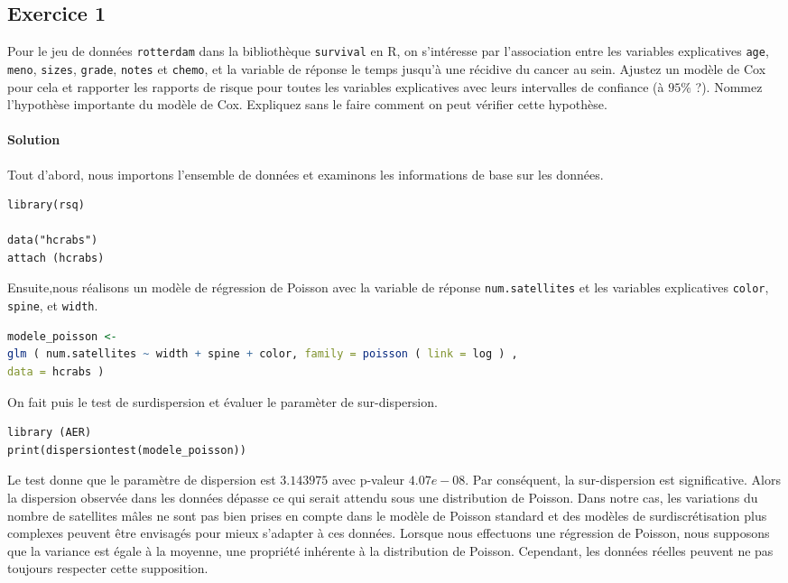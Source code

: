 \documentclass[../main.tex]{subfiles}
\begin{document}
\begin{CJK*}{UTF8}{gbsn}
\section*{Exercice 1}



Pour le jeu de données 
\texttt{rotterdam} dans la bibliothèque \texttt{survival} en R, 
on s'intéresse par l'association entre les variables explicatives \texttt{age}, \texttt{meno}, 
\texttt{sizes}, \texttt{grade}, \texttt{notes} et \texttt{chemo},
et la variable de réponse le temps jusqu'à une récidive du cancer au sein.
Ajustez un modèle de Cox pour cela et rapporter 
les rapports de risque pour toutes les variables explicatives avec leurs intervalles de confiance (à $95\%$ ?).
Nommez l'hypothèse importante du modèle de Cox. 
Expliquez sans le faire comment on peut vérifier cette hypothèse.

\paragraph{Solution}
Tout d'abord, nous importons l'ensemble de données et examinons les informations de base sur les données.

\begin{lstlisting}
library(rsq)

data("hcrabs")
attach (hcrabs)

\end{lstlisting}

Ensuite,nous réalisons 
un modèle de régression de Poisson avec la variable de réponse \texttt{num.satellites} 
et les variables explicatives \texttt{color}, \texttt{spine}, et \texttt{width}.

\begin{lstlisting}[language=R]
modele_poisson <- 
glm ( num.satellites ~ width + spine + color, family = poisson ( link = log ) ,
data = hcrabs ) 
\end{lstlisting}

On fait puis le test de surdispersion et évaluer le paramèter de sur-dispersion.

\begin{lstlisting}
library (AER)
print(dispersiontest(modele_poisson))
\end{lstlisting}

Le test donne que le paramètre de dispersion est $3.143975$ avec p-valeur $4.07e-08$.
Par conséquent, la sur-dispersion est significative.
Alors la dispersion observée dans les données 
dépasse ce qui serait attendu sous une distribution de Poisson. 
Dans notre cas, les variations du nombre de satellites mâles ne sont pas 
bien prises en compte dans le modèle de Poisson standard et 
des modèles de surdiscrétisation plus complexes peuvent être envisagés pour mieux s'adapter à ces données.
Lorsque nous effectuons une régression de Poisson, nous supposons que la variance est égale à la moyenne, 
une propriété inhérente à la distribution de Poisson. 
Cependant, les données réelles peuvent ne pas toujours respecter cette supposition. 


\end{CJK*}
\end{document}
